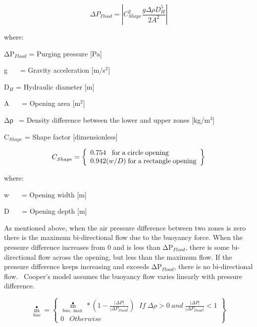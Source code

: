 \begin{equation}
\Delta {P_{Flood}} = \left| {C_{Shape}^2\frac{{g\Delta \rho D_H^5}}{{2{A^2}}}} \right|
\end{equation}

where:

ΔP\(_{Flood}\) = Purging pressure {[}Pa{]}

g~~~ = Gravity acceleration {[}m/s\(^{2}\){]}

D\(_{H}\) = Hydraulic diameter {[}m{]}

A~~~ = Opening area {[}m\(^{2}\){]}

Δρ~ = Density difference between the lower and upper zones {[}kg/m\(^{3}\){]}

C\(_{Shape}\) = Shape factor {[}dimensionless{]}

\begin{equation}
C_{Shape}^{} = \left\{ \begin{array}{l}0.754\;\;\;{\rm{for}}\;{\rm{a}}\;{\rm{circle}}\;{\rm{opening}}\\0.942(w/D)\;{\rm{for}}\;{\rm{a}}\;{\rm{rectangle}}\;{\rm{opening}}\end{array} \right\}
\end{equation}

where:

w~~~ = Opening width {[}m{]}

D~~~ = Opening depth {[}m{]}

As mentioned above, when the air pressure difference between two zones is zero there is the maximum bi-directional flow due to the buoyancy force. When the pressure difference increases from 0 and is less than \textbar{}ΔP\(_{Flood}\)\textbar{}, there is some bi-directional flow across the opening, but less than the maximum flow. If the pressure difference keeps increasing and exceeds \textbar{}ΔP\(_{Flood}\)\textbar{}, there is no bi-directional flow.~ Cooper's model assumes the buoyancy flow varies linearly with pressure difference.

\begin{equation}
{\mathop m\limits^ \bullet_{buo}} = \left\{ \begin{array}{l}{\mathop m\limits^ \bullet_{buo,\max }}*\left( {1 - \frac{{\left| {\Delta P} \right|}}{{\left| {\Delta {P_{Flood}}} \right|}}} \right)\;\,\,If\;\Delta \rho  > 0\;and\;\frac{{\left| {\Delta P} \right|}}{{\left| {\Delta {P_{Flood}}} \right|}} < 1\\0\;\,\,\,Otherwise\end{array} \right\}
\end{equation}

